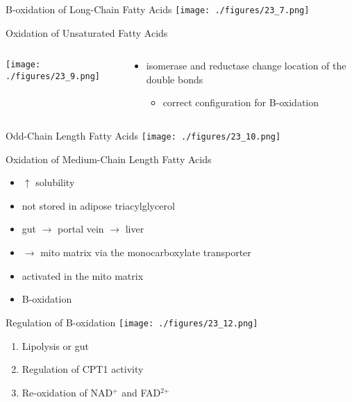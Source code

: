 \documentclass[presentation, smaller]{beamer}
\begin{document}
\begin{frame}[label={sec:orgheadline10}]{B-oxidation of Long-Chain Fatty Acids}
\centering
\texttt{[image: ./figures/23\_7.png]}
\end{frame}

\begin{frame}[label={sec:orgheadline11}]{Oxidation of Unsaturated Fatty Acids}
\begin{columns}
\begin{column}{0.5\columnwidth}
\centering
\texttt{[image: ./figures/23\_9.png]}
\end{column}

\begin{column}{0.5\columnwidth}
\begin{itemize}
\item isomerase and reductase change location of the double bonds
\begin{itemize}
\item correct configuration for B-oxidation
\end{itemize}
\end{itemize}
\end{column}
\end{columns}
\end{frame}
\begin{frame}[label={sec:orgheadline12}]{Odd-Chain Length Fatty Acids}
\centering
\texttt{[image: ./figures/23\_10.png]}
\end{frame}

\begin{frame}[label={sec:orgheadline13}]{Oxidation of Medium-Chain Length Fatty Acids}
\begin{itemize}
\item \(\uparrow\) solubility
\item not stored in adipose triacylglycerol
\item gut \(\to\) portal vein \(\to\) liver
\item \(\to\) mito matrix via the monocarboxylate transporter
\item activated in the mito matrix
\item B-oxidation
\end{itemize}
\end{frame}

\begin{frame}[label={sec:orgheadline14}]{Regulation of B-oxidation}
\centering
\texttt{[image: ./figures/23\_12.png]}

\begin{enumerate}
\item Lipolysis or gut
\item Regulation of CPT1 activity
\item Re-oxidation of NAD\(^{\text{+}}\) and FAD\(^{\text{2+}}\)
\end{enumerate}
\end{frame}
\end{document}
